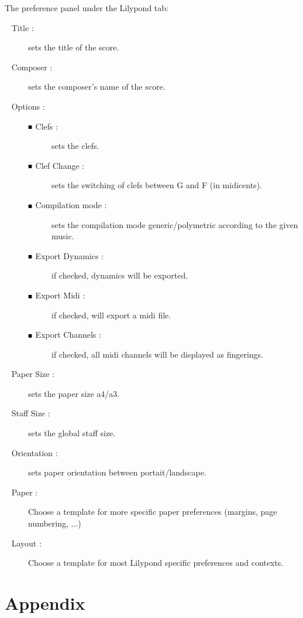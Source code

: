 \documentclass{article}
\newcommand\bck{$\scalebox{0.6}{$\blacksquare$}~$}
\begin{document}
The preference panel under the Lilypond tab:\\
\begin{description}
\item [\textbullet~ Title :]	 sets the title of the score.

\item [\textbullet~ Composer :] sets the composer's name of the score.

\item [\textbullet~ Options :] \phantom{}
  \begin{description}
  \item [\bck Clefs :]  sets the clefs. 
  \item [\bck Clef Change :] sets the switching of clefs between G and F (in midicents). 
  \item [\bck Compilation mode :] sets the compilation mode generic/polymetric according to the given music.
  \item [\bck Export Dynamics :] if checked, dynamics will be exported.
  \item [\bck Export Midi :] if checked, will export a midi file.
  \item [\bck Export Channels :] if checked, all midi channels will be displayed as fingerings.
  \end{description}

\item [\textbullet~ Paper Size :] sets the paper size a4/a3.

\item [\textbullet~ Staff Size :] sets the global staff size.

\item [\textbullet~ Orientation :] sets paper orientation between portait/landscape.

\item [\textbullet~ Paper :] Choose a template for more specific paper preferences (margins, page numbering, ...)

\item [\textbullet~ Layout :] Choose a template for most Lilypond specific preferences and contexts.

\end{description}

\appendix
\section{Appendix}
\end{document}
